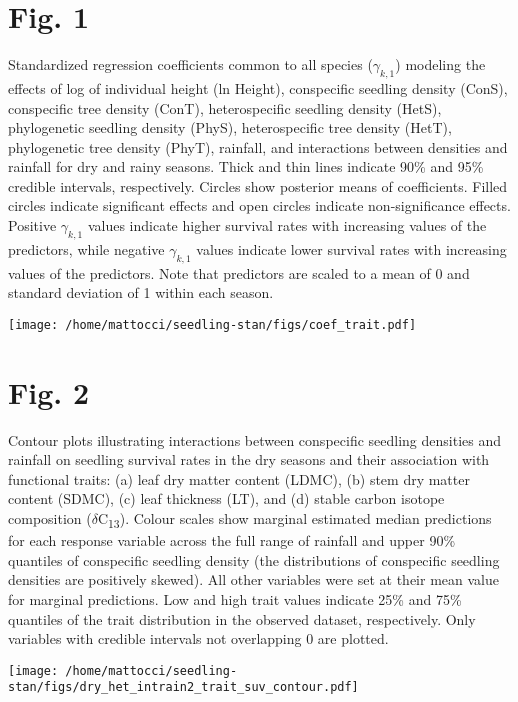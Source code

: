 \documentclass[
  12pt,
  letterpaper,
  DIV=11,
  numbers=noendperiod]{scrartcl}
\begin{document}
\newpage

\hypertarget{fig.-1}{%
\section{Fig. 1}\label{fig.-1}}

Standardized regression coefficients common to all species
(\(\gamma_{k,1}\)) modeling the effects of log of individual height (ln
Height), conspecific seedling density (ConS), conspecific tree density
(ConT), heterospecific seedling density (HetS), phylogenetic seedling
density (PhyS), heterospecific tree density (HetT), phylogenetic tree
density (PhyT), rainfall, and interactions between densities and
rainfall for dry and rainy seasons. Thick and thin lines indicate 90\%
and 95\% credible intervals, respectively. Circles show posterior means
of coefficients. Filled circles indicate significant effects and open
circles indicate non-significance effects. Positive \(\gamma_{k,1}\)
values indicate higher survival rates with increasing values of the
predictors, while negative \(\gamma_{k,1}\) values indicate lower
survival rates with increasing values of the predictors. Note that
predictors are scaled to a mean of 0 and standard deviation of 1 within
each season.

\texttt{[image: /home/mattocci/seedling-stan/figs/coef\_trait.pdf]}

\newpage

\hypertarget{fig.-2}{%
\section{Fig. 2}\label{fig.-2}}

Contour plots illustrating interactions between conspecific seedling
densities and rainfall on seedling survival rates in the dry seasons and
their association with functional traits: (a) leaf dry matter content
(LDMC), (b) stem dry matter content (SDMC), (c) leaf thickness (LT), and
(d) stable carbon isotope composition (\(\delta\)C\textsubscript{13}).
Colour scales show marginal estimated median predictions for each
response variable across the full range of rainfall and upper 90\%
quantiles of conspecific seedling density (the distributions of
conspecific seedling densities are positively skewed). All other
variables were set at their mean value for marginal predictions. Low and
high trait values indicate 25\% and 75\% quantiles of the trait
distribution in the observed dataset, respectively. Only variables with
credible intervals not overlapping 0 are plotted.

\texttt{[image: /home/mattocci/seedling-stan/figs/dry\_het\_intrain2\_trait\_suv\_contour.pdf]}
\end{document}
